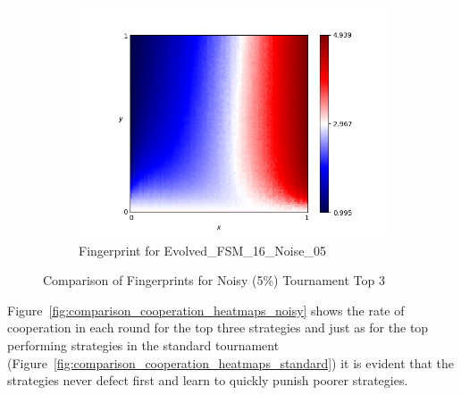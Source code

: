 \documentclass{article}
\begin{document}
\begin{figure}[!hbtp]
\begin{subfigure}[t]{.3\textwidth}
        \includegraphics[width=\textwidth]{./assets/Evolved_FSM_16_Noise_05.png}
        \caption{Fingerprint for Evolved\_FSM\_16\_Noise\_05}
    \end{subfigure}%

    \caption{Comparison of Fingerprints for Noisy (5\%) Tournament Top 3}
    \label{fig:comparison_fingerprint_noisy}
\end{figure}

Figure~\ref{fig:comparison_cooperation_heatmaps_noisy} shows the rate of
cooperation in each round for the top three strategies and just as for the top
performing strategies in the standard tournament
(Figure~\ref{fig:comparison_cooperation_heatmaps_standard}) it is evident that
the strategies never defect first and learn to quickly punish poorer strategies.
\end{document}
